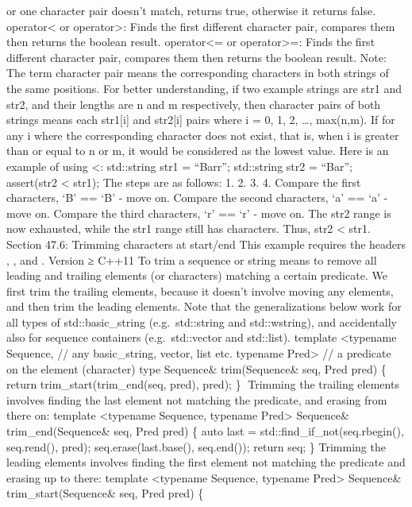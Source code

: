 or one character pair doesn't match, returns true, otherwise it returns
false. operator\textless{} or operator\textgreater: Finds the ﬁrst
diﬀerent character pair, compares them then returns the boolean result.
operator\textless= or operator\textgreater=: Finds the ﬁrst diﬀerent
character pair, compares them then returns the boolean result. Note: The
term character pair means the corresponding characters in both strings
of the same positions. For better understanding, if two example strings
are str1 and str2, and their lengths are n and m respectively, then
character pairs of both strings means each str1{[}i{]} and str2{[}i{]}
pairs where i = 0, 1, 2, \ldots, max(n,m). If for any i where the
corresponding character does not exist, that is, when i is greater than
or equal to n or m, it would be considered as the lowest value. Here is
an example of using \textless: std::string str1 = ``Barr''; std::string
str2 = ``Bar''; assert(str2 \textless{} str1); The steps are as follows:
1. 2. 3. 4. Compare the ﬁrst characters, `B' == `B' - move on. Compare
the second characters, `a' == `a' - move on. Compare the third
characters, `r' == `r' - move on. The str2 range is now exhausted, while
the str1 range still has characters. Thus, str2 \textless{} str1.
Section 47.6: Trimming characters at start/end This example requires the
headers , , and . Version ≥ C++11 To trim a sequence or string means to
remove all leading and trailing elements (or characters) matching a
certain predicate. We ﬁrst trim the trailing elements, because it
doesn't involve moving any elements, and then trim the leading elements.
Note that the generalizations below work for all types of
std::basic\_string (e.g.~std::string and std::wstring), and accidentally
also for sequence containers (e.g.~std::vector and std::list). template
\textless typename Sequence, // any basic\_string, vector, list etc.
typename Pred\textgreater{} // a predicate on the element (character)
type Sequence\& trim(Sequence\& seq, Pred pred) \{ return
trim\_start(trim\_end(seq, pred), pred); \} Trimming the trailing
elements involves ﬁnding the last element not matching the predicate,
and erasing from there on: template \textless typename Sequence,
typename Pred\textgreater{} Sequence\& trim\_end(Sequence\& seq, Pred
pred) \{ auto last = std::find\_if\_not(seq.rbegin(), seq.rend(), pred);
seq.erase(last.base(), seq.end()); return seq; \} Trimming the leading
elements involves ﬁnding the ﬁrst element not matching the predicate and
erasing up to there: template \textless typename Sequence, typename
Pred\textgreater{} Sequence\& trim\_start(Sequence\& seq, Pred pred) \{
